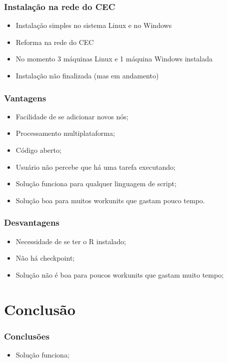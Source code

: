 \documentclass{beamer}
\begin{document}
\begin{frame}
  \frametitle{Instalação na rede do CEC}
  \begin{itemize}
    \item Instalação simples no sistema Linux e no Windows
    \item Reforma na rede do CEC
    \item No momento 3 máquinas Linux e 1 máquina Windows instalada
    \item Instalação não finalizada (mas em andamento)
  \end{itemize}
\end{frame}

\begin{frame}
  \frametitle{Vantagens}
  \begin{itemize}
    \item Facilidade de se adicionar novos nós;
    \item Processamento multiplataforma;
    \item Código aberto;
    \item Usuário não percebe que há uma tarefa executando;
    \item Solução funciona para qualquer linguagem de script;
    \item Solução boa para muitos workunits que gastam pouco tempo.
  \end{itemize}
\end{frame}

\begin{frame} 
  \frametitle{Desvantagens}
  \begin{itemize}
    \item Necessidade de se ter o R instalado;
    \item Não há checkpoint;
    \item Solução não é boa para poucos workunits que gastam muito tempo; 
  \end{itemize}
\end{frame}

\section{Conclusão}

\begin{frame}
  \frametitle{Conclusões}
  \begin{itemize}
    \item Solução funciona;
  \end{itemize}
\end{frame}
\end{document}
